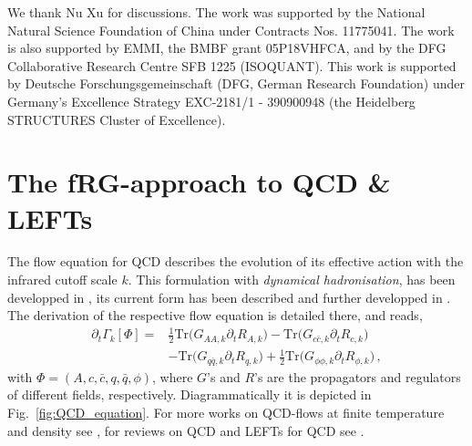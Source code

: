 \documentclass[%
reprint,
superscriptaddress,
showpacs,preprintnumbers,
amsmath,amssymb,
aps,
prd,
]{revtex4-1}
\def\Fig#1{Fig.~\ref{#1}} \def\Tab#1{Tab.~\ref{#1}}
\begin{document}
	
	
	
\begin{acknowledgments}
		
We thank Nu Xu for discussions. The work was supported by the National Natural Science Foundation of China under Contracts Nos. 11775041. The work is also supported by EMMI, the BMBF grant 05P18VHFCA, and by the DFG Collaborative Research Centre SFB 1225 (ISOQUANT). This work is supported by Deutsche Forschungsgemeinschaft (DFG, German Research Foundation) under Germany’s Excellence Strategy EXC-2181/1 - 390900948 (the Heidelberg STRUCTURES Cluster of Excellence).
		
\end{acknowledgments}

	
\appendix
	
\section{The fRG-approach to QCD \& LEFTs}\label{app:fRG}
	
The flow equation for QCD describes the evolution of its effective action with the infrared cutoff scale $k$. This formulation with \textit{dynamical hadronisation}, \cite{Gies:2001nw, Gies:2002hq, Pawlowski:2005xe, Floerchinger:2009uf, Fu:2019hdw} has been developped in \cite{Mitter:2014wpa,Braun:2014ata,Cyrol:2017ewj,Fu:2019hdw}, its current form has been described and further developped in \cite{Fu:2019hdw}. The derivation of the respective flow equation is detailed there, and reads, 
%
\begin{align}
\partial_t\Gamma_k[\Phi]=&\frac{1}{2}\mathrm{Tr}\Big(G_{AA,k}\partial_t R_{A,k}\Big)-\mathrm{Tr}\Big(G_{c\bar c,k}\partial_t R_{c,k}\Big)\nonumber\\[2ex]
&-\mathrm{Tr}\Big(G_{q\bar q,k}\partial_t R_{q,k}\Big)+\frac{1}{2}\mathrm{Tr}\Big(G_{\phi\phi,k}\partial_t R_{\phi,k}\Big)\,,\label{eq:QCDflow}
\end{align}
%
with $\Phi=(A, c, \bar c, q,\bar q,\phi)$, where $G$'s and $R$'s are the propagators and regulators of different fields, respectively. Diagrammatically it is depicted in \Fig{fig:QCD_equation}. For more works on QCD-flows at finite temperature and density see \cite{Braun:2007bx,Braun:2008pi,Braun:2009gm,Mitter:2014wpa,Braun:2014ata,Cyrol:2016tym,Cyrol:2017ewj,Cyrol:2017qkl,Fu:2019hdw,Braun:2020ada}, for reviews on QCD and LEFTs for QCD see    \cite{Berges:2000ew,Pawlowski:2005xe,Schaefer:2006sr,Gies:2006wv,Rosten:2010vm,Braun:2011pp,Pawlowski:2014aha,Dupuis:2020fhh}.
	
\end{document}
